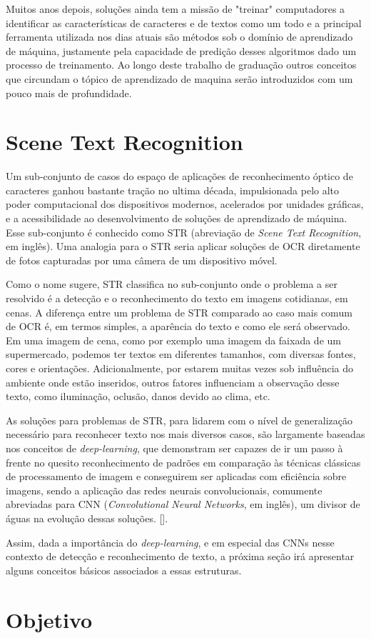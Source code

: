 Muitos anos depois, soluções ainda tem a missão de "treinar" computadores a identificar as características de caracteres e de textos como um todo e a principal ferramenta utilizada nos dias atuais são métodos sob o domínio de aprendizado de máquina, justamente pela capacidade de predição desses algoritmos dado um processo de treinamento. Ao longo deste trabalho de graduação outros conceitos que circundam o tópico de aprendizado de maquina serão introduzidos com um pouco mais de profundidade.

\section{Scene Text Recognition}

Um sub-conjunto de casos do espaço de aplicações de reconhecimento óptico de caracteres ganhou bastante tração no ultima década, impulsionada pelo alto poder computacional dos dispositivos modernos, acelerados por unidades gráficas, e a acessibilidade ao desenvolvimento de soluções de aprendizado de máquina. Esse sub-conjunto é conhecido como STR (abreviação de \textit{Scene Text Recognition}, em inglês). Uma analogia para o STR seria aplicar soluções de OCR diretamente de fotos capturadas por uma câmera de um dispositivo móvel.

Como o nome sugere, STR classifica no sub-conjunto onde o problema a ser resolvido é a detecção e o reconhecimento do texto em imagens cotidianas, em cenas. A diferença entre um problema de STR comparado ao caso mais comum de OCR é, em termos simples, a aparência do texto e como ele será observado. Em uma imagem de cena, como por exemplo uma imagem da faixada de um supermercado, podemos ter textos em diferentes tamanhos, com diversas fontes, cores e orientações. Adicionalmente, por estarem muitas vezes sob influência do ambiente onde estão inseridos, outros fatores influenciam a observação desse texto, como iluminação, oclusão, danos devido ao clima, etc.


As soluções para problemas de STR, para lidarem com o nível de generalização necessário para reconhecer texto nos mais diversos casos, são largamente baseadas nos conceitos de \textit{deep-learning}, que demonstram ser capazes de ir um passo à frente no quesito reconhecimento de padrões em comparação às técnicas clássicas de processamento de imagem e conseguirem ser aplicadas com eficiência sobre imagens, sendo a aplicação das redes neurais convolucionais, comumente abreviadas para CNN (\textit{Convolutional Neural Networks}, em inglês), um divisor de águas na evolução dessas soluções. [].

Assim, dada a importância do \textit{deep-learning}, e em especial das CNNs nesse contexto de detecção e reconhecimento de texto, a próxima seção irá apresentar alguns conceitos básicos associados a essas estruturas.

\section{Objetivo}

\lipsum[36]
